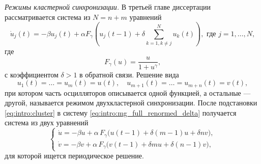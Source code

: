 %
%

\textit{Режимы кластерной синхронизации.} 
В третьей главе диссертации рассматривается система из $N = n + m$ уравнений
\begin{equation}
	\label{eq:intro:mg_full_renormed_delta}
	\dot{u}_j(t) = -\beta u_j(t) + \alpha F_{\gamma} \left(u_j(t - 1) + \delta\sum\limits_{k = 1, k\neq j}^N u_k(t)\right), \text{ где } j = 1, \dots, N,
\end{equation}
где
\[
F_{\gamma}(u) = \dfrac{u}{1 + u^{\gamma}},
\]
с коэффициентом $\delta > 1$ в обратной связи. Решение вида 
\begin{equation}
	\label{eq:intro:cluster}
	u_1(t)=\ldots=u_m(t) = u(t),\quad u_{m+1}(t)=\ldots=u_{m+n}(t) = v(t),
\end{equation}
при котором часть осцилляторов описывается одной функцией, а остальные --- другой, называется режимом двухкластерной синхронизации. После подстановки \eqref{eq:intro:cluster} в систему \eqref{eq:intro:mg_full_renormed_delta} получается система из двух уравнений
%
\begin{equation}
	\label{eq:intro:system_uv}
	\begin{cases}
		\dot{u} = -\beta u + \alpha \, F_{\gamma} \big(u(t - 1) + \delta (m - 1) u + \delta n v\big),\\
		\dot{v} = -\beta v + \alpha \, F_{\gamma} \big(v(t - 1) + \delta m u + \delta (n - 1) v\big),
	\end{cases}
\end{equation}
%
для которой ищется периодическое решение.

